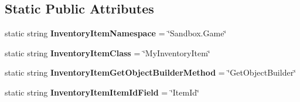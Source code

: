 \subsection*{Static Public Attributes}
\begin{DoxyCompactItemize}
\item 
\hypertarget{class_s_e_mod_a_p_i_internal_1_1_a_p_i_1_1_entity_1_1_inventory_item_entity_a97f4c40e37846a9b68d011207b821278}{}static string {\bfseries Inventory\+Item\+Namespace} = \char`\"{}Sandbox.\+Game\char`\"{}\label{class_s_e_mod_a_p_i_internal_1_1_a_p_i_1_1_entity_1_1_inventory_item_entity_a97f4c40e37846a9b68d011207b821278}

\item 
\hypertarget{class_s_e_mod_a_p_i_internal_1_1_a_p_i_1_1_entity_1_1_inventory_item_entity_a89cfc24e9ff44c027443c6a3996d08e4}{}static string {\bfseries Inventory\+Item\+Class} = \char`\"{}My\+Inventory\+Item\char`\"{}\label{class_s_e_mod_a_p_i_internal_1_1_a_p_i_1_1_entity_1_1_inventory_item_entity_a89cfc24e9ff44c027443c6a3996d08e4}

\item 
\hypertarget{class_s_e_mod_a_p_i_internal_1_1_a_p_i_1_1_entity_1_1_inventory_item_entity_a974be0e15bd16ccfdca360f2e728bd17}{}static string {\bfseries Inventory\+Item\+Get\+Object\+Builder\+Method} = \char`\"{}Get\+Object\+Builder\char`\"{}\label{class_s_e_mod_a_p_i_internal_1_1_a_p_i_1_1_entity_1_1_inventory_item_entity_a974be0e15bd16ccfdca360f2e728bd17}

\item 
\hypertarget{class_s_e_mod_a_p_i_internal_1_1_a_p_i_1_1_entity_1_1_inventory_item_entity_aa415a23313c58c1843b3d88b55461edb}{}static string {\bfseries Inventory\+Item\+Item\+Id\+Field} = \char`\"{}Item\+Id\char`\"{}\label{class_s_e_mod_a_p_i_internal_1_1_a_p_i_1_1_entity_1_1_inventory_item_entity_aa415a23313c58c1843b3d88b55461edb}

\end{DoxyCompactItemize}
